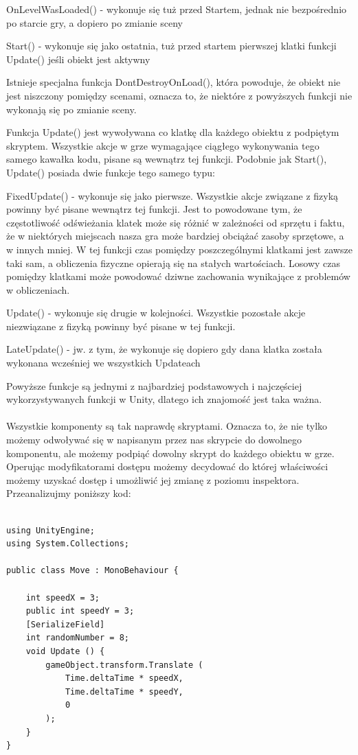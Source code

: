 \documentclass[openright]{xmgr}
\begin{document}
OnLevelWasLoaded() - wykonuje się tuż przed Startem, jednak nie bezpośrednio po starcie gry, a dopiero po zmianie sceny

Start() - wykonuje się jako ostatnia, tuż przed startem pierwszej klatki funkcji Update() jeśli obiekt jest aktywny

Istnieje specjalna funkcja DontDestroyOnLoad(), która powoduje, że obiekt nie jest niszczony pomiędzy scenami, oznacza to, że niektóre z powyższych funkcji nie wykonają się po zmianie sceny.

Funkcja Update() jest wywoływana co klatkę dla każdego obiektu z podpiętym skryptem. Wszystkie akcje w grze wymagające ciągłego wykonywania tego samego kawałka kodu, pisane są wewnątrz tej funkcji. Podobnie jak Start(), Update() posiada dwie funkcje tego samego typu:

FixedUpdate() - wykonuje się jako pierwsze. Wszystkie akcje związane z fizyką powinny być pisane wewnątrz tej funkcji. Jest to powodowane tym, że częstotliwość odświeżania klatek może się różnić w zależności od sprzętu i faktu, że w niektórych miejscach nasza gra może bardziej obciążać zasoby sprzętowe, a w innych mniej. W tej funkcji czas pomiędzy poszczególnymi klatkami jest zawsze taki sam, a obliczenia fizyczne opierają się na stałych wartościach. Losowy czas pomiędzy klatkami może powodować dziwne zachowania wynikające z problemów w obliczeniach.

Update() - wykonuje się drugie w kolejności. Wszystkie pozostałe akcje niezwiązane z fizyką powinny być pisane w tej funkcji.

LateUpdate() - jw. z tym, że wykonuje się dopiero gdy dana klatka została wykonana wcześniej we wszystkich Updateach

Powyższe funkcje są jednymi z najbardziej podstawowych i najczęściej wykorzystywanych funkcji w Unity, dlatego ich znajomość jest taka ważna.
\\
\\
Wszystkie komponenty są tak naprawdę skryptami. Oznacza to, że nie tylko możemy odwoływać się w napisanym przez nas skrypcie do dowolnego komponentu, ale możemy podpiąć dowolny skrypt do każdego obiektu w grze. Operując modyfikatorami dostępu możemy decydować do której właściwości możemy uzyskać dostęp i umożliwić jej zmianę z poziomu inspektora. Przeanalizujmy poniższy kod:

\newpage
\begin{lstlisting}

using UnityEngine;
using System.Collections;

public class Move : MonoBehaviour {

	int speedX = 3;
	public int speedY = 3;
	[SerializeField]
	int randomNumber = 8;
	void Update () {
		gameObject.transform.Translate (
			Time.deltaTime * speedX, 
			Time.deltaTime * speedY,
			0
		);
	}
}
\end{lstlisting}
\end{document}
